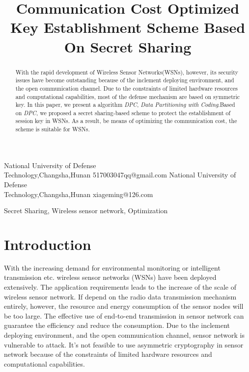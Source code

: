 \documentclass[nocopyrightspace,9pt]{sigplanconf}
\begin{document}
\title{Communication Cost Optimized Key Establishment Scheme Based On Secret Sharing}

           {National University of Defense\\Technology,Changsha,Hunan}
           {517003047qq@gmail.com}
           {National University of Defense\\Technology,Changsha,Hunan}
           {xiageming@126.com}

\maketitle

\begin{abstract}
With the rapid development of Wireless Sensor Networks(WSNs),
however, its security issues have become outstanding because of the
inclement deploying environment, and the open communication channel.
Due to the constraints of limited hardware resources
and computational capabilities, most of the defense mechanism are based on
symmetric key. In this paper, we present a algorithm \textit{DPC},
\textit{Data Partitioning with Coding}.Based on \textit{DPC}, we proposed a secret
sharing-based scheme to protect the
establishment of session key in WSNs. As a result, be means of optimizing the
communication cost, the scheme is suitable for WSNs.
\end{abstract}

\keywords
Secret Sharing, Wireless sensor network, Optimization

\section{Introduction}
With the increasing demand for environmental monitoring or
intelligent transmission etc. wireless sensor networks (WSNs) have been deployed
extensively. The application requirements leads to the
increase of the scale of wireless sensor network. If depend on the radio
data transmission mechanism entirely, however, the resource and energy consumption of
the sensor nodes will be too large. The effective use of end-to-end
transmission in sensor network can guarantee the efficiency and reduce the consumption.
Due to the inclement deploying environment, and the open communication channel,
sensor network is vulnerable to attack. It's not feasible to use asymmetric
cryptography in sensor network because of the constraints of limited hardware
resources and computational capabilities\cite{carman2000constraints}.\\
\end{document}
